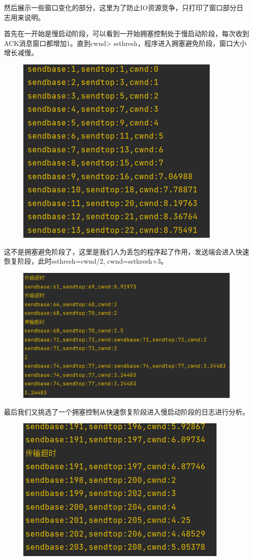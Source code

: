 \documentclass[UTF8,a4paper,10pt]{ctexart}
\begin{document}
然后展示一些窗口变化的部分，这里为了防止IO资源竞争，只打印了窗口部分日志用来说明。

首先在一开始是慢启动阶段，可以看到一开始拥塞控制处于慢启动阶段，每次收到ACK消息窗口都增加1。直到cwnd> ssthresh，程序进入拥塞避免阶段，窗口大小增长减慢。
\begin{figure}[H]
    \centering
    \includegraphics[scale=0.5]{GW3.png}
    \label{fig:7}
\end{figure}
这不是拥塞避免阶段了，这里是我们人为丢包的程序起了作用，发送端会进入快速恢复阶段，此时ssthresh=cwnd/2, cwnd=ssthresh+3。
\begin{figure}[H]
    \centering
    \includegraphics[scale=0.4]{GW4.png}
    \label{fig:7}
\end{figure}
最后我们又挑选了一个拥塞控制从快速恢复阶段进入慢启动阶段的日志进行分析。
\begin{figure}[H]
    \centering
    \includegraphics[scale=0.5]{GW5.png}
    \label{fig:7}
\end{figure}
\end{document}
